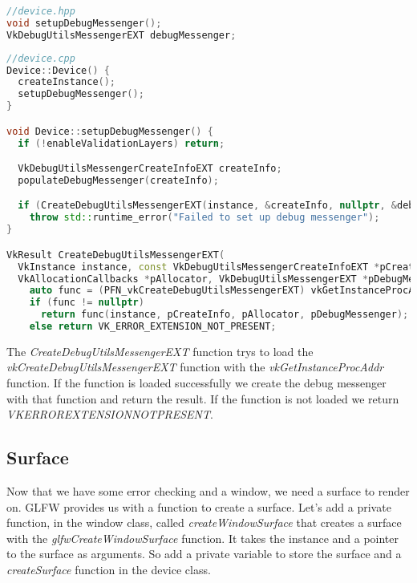\documentclass[12pt]{report} \usepackage{preamble}
\begin{document}
\begin{lstlisting}[language=C++]
//device.hpp
void setupDebugMessenger();
VkDebugUtilsMessengerEXT debugMessenger;
\end{lstlisting}

\begin{lstlisting}[language=C++]
//device.cpp
Device::Device() {
  createInstance();
  setupDebugMessenger();
}

void Device::setupDebugMessenger() {
  if (!enableValidationLayers) return;

  VkDebugUtilsMessengerCreateInfoEXT createInfo;
  populateDebugMessenger(createInfo);

  if (CreateDebugUtilsMessengerEXT(instance, &createInfo, nullptr, &debugMessenger) != VK_SUCCESS)
    throw std::runtime_error("Failed to set up debug messenger");
}

VkResult CreateDebugUtilsMessengerEXT(
  VkInstance instance, const VkDebugUtilsMessengerCreateInfoEXT *pCreateInfo,
  VkAllocationCallbacks *pAllocator, VkDebugUtilsMessengerEXT *pDebugMessenger) {
    auto func = (PFN_vkCreateDebugUtilsMessengerEXT) vkGetInstanceProcAddr(instance, "vkCreateDebugUtilsMessengerEXT");
    if (func != nullptr) 
      return func(instance, pCreateInfo, pAllocator, pDebugMessenger);
    else return VK_ERROR_EXTENSION_NOT_PRESENT;
\end{lstlisting}

The \textit{CreateDebugUtilsMessengerEXT} function trys to load the \textit{vkCreateDebugUtilsMessengerEXT}
function with the \textit{vkGetInstanceProcAddr} function. If the function is loaded successfully
we create the debug messenger with that function and return the result. If the function is not loaded
we return \textit{VK\textunderscore ERROR\textunderscore EXTENSION\textunderscore NOT\textunderscore PRESENT}.

\subsection{Surface}

Now that we have some error checking and a window, we need a surface to render on.
GLFW provides us with a function to create a surface. Let's add a private function,
in the window class, called
\textit{createWindowSurface} that creates a surface with the \textit{glfwCreateWindowSurface} function.
It takes the instance and a pointer to the surface as arguments. So add a private variable
to store the surface and a \textit{createSurface} function in the device class.
\end{document}
